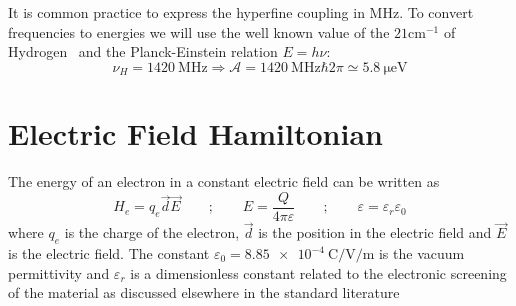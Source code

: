It is common practice to express the hyperfine coupling in $\si{\MHz}$. To convert frequencies to energies we will use the well known value of the $21\si{\cm^{-1}}$ of Hydrogen~\cite{Hellwig1970} and the Planck-Einstein relation $E=h\nu$:
\begin{equation}
  \nu_H = \SI{1420}{\MHz} \Rightarrow \mathcal{A} = \SI{1420}{\MHz}\hbar2\pi\simeq
  \SI{5.8}{\micro\eV}
\end{equation}


\section{Electric Field Hamiltonian}
The energy of an electron in a constant electric field can be written as~\cite{Castro2010a}
\begin{equation}
  H_e = q_e \vec{d} \vec{E} \qquad;\qquad E = \frac{Q}{4\pi\varepsilon} \qquad;\qquad
  \varepsilon = \varepsilon_r\varepsilon_0
\end{equation}
where $q_e$ is the charge of the electron, $\vec{d}$ is the position in the electric field and $\vec{E}$ is the electric field. The constant $\varepsilon_0 = \SI{8.85e-4}{\coulomb\per\volt\per\metre}$ is the vacuum permittivity and $\varepsilon_r$ is a dimensionless constant related to the electronic screening of the material as discussed elsewhere in the standard literature\cite{Castro2010a,Yamashiro2012}

